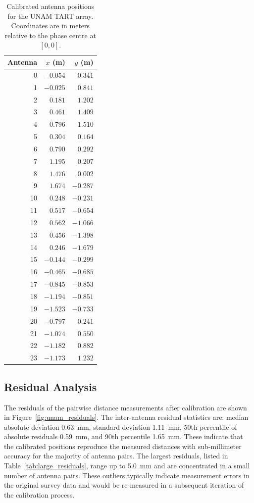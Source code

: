 \documentclass[twocolumn, a4paper,10pt]{article}
\begin{document}
\begin{table}[ht]
	\centering
	\caption{Calibrated antenna positions for the UNAM TART array. Coordinates are in meters relative to the phase centre at $[0,0]$.}
	\label{tab:positions}
	\begin{tabular}{|rrr|}
		\hline
		Antenna & $x$ (m)  & $y$ (m)  \\
		\hline
		0       & $-0.054$ & $0.341$  \\
		1       & $-0.025$ & $0.841$  \\
		2       & $0.181$  & $1.202$  \\
		3       & $0.461$  & $1.409$  \\
		4       & $0.796$  & $1.510$  \\
		5       & $0.304$  & $0.164$  \\
		6       & $0.790$  & $0.292$  \\
		7       & $1.195$  & $0.207$  \\
		8       & $1.476$  & $0.002$  \\
		9       & $1.674$  & $-0.287$ \\
		10      & $0.248$  & $-0.231$ \\
		11      & $0.517$  & $-0.654$ \\
		12      & $0.562$  & $-1.066$ \\
		13      & $0.456$  & $-1.398$ \\
		14      & $0.246$  & $-1.679$ \\
		15      & $-0.144$ & $-0.299$ \\
		16      & $-0.465$ & $-0.685$ \\
		17      & $-0.845$ & $-0.853$ \\
		18      & $-1.194$ & $-0.851$ \\
		19      & $-1.523$ & $-0.733$ \\
		20      & $-0.797$ & $0.241$  \\
		21      & $-1.074$ & $0.550$  \\
		22      & $-1.182$ & $0.882$  \\
		23      & $-1.173$ & $1.232$  \\
		\hline
	\end{tabular}
\end{table}

\subsection{Residual Analysis}

The residuals of the pairwise distance measurements after calibration are shown in Figure~\ref{fig:unam_residuals}. The inter-antenna residual statistics are: median absolute deviation 0.63~mm, standard deviation 1.11~mm, 50th percentile of absolute residuals 0.59~mm, and 90th percentile 1.65~mm. These indicate that the calibrated positions reproduce the measured distances with sub-millimeter accuracy for the majority of antenna pairs. The largest residuals, listed in Table~\ref{tab:large_residuals}, range up to 5.0~mm and are concentrated in a small number of antenna pairs. These outliers typically indicate measurement errors in the original survey data and would be re-measured in a subsequent iteration of the calibration process.
\end{document}
